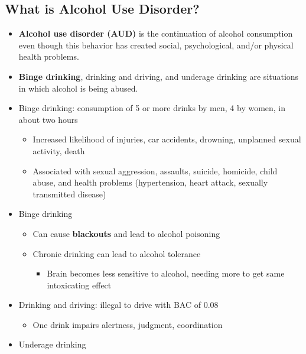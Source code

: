 \documentclass[12pt]{article}
\begin{document}
        \subsection{What is Alcohol Use Disorder?}
            \begin{itemize}
                \item \textbf{Alcohol use disorder (AUD)} is the continuation of alcohol consumption even though this behavior has created social, psychological, and/or physical health problems.
                \item \textbf{Binge drinking}, drinking and driving, and underage drinking are situations in which alcohol is being abused.
                \item Binge drinking: consumption of 5 or more drinks by men, 4 by women, in about two hours
                    \begin{itemize}
                        \item Increased likelihood of injuries, car accidents, drowning, unplanned sexual activity, death
                        \item Associated with sexual aggression, assaults, suicide, homicide, child abuse, and health problems (hypertension, heart attack, sexually transmitted disease)
                    \end{itemize}
                \item Binge drinking
                    \begin{itemize}
                        \item Can cause \textbf{blackouts} and lead to alcohol poisoning
                        \item Chronic drinking can lead to alcohol tolerance
                            \begin{itemize}
                                \item Brain becomes less sensitive to alcohol, needing more to get same intoxicating effect
                            \end{itemize}
                    \end{itemize}
                \item Drinking and driving: illegal to drive with BAC of 0.08
                    \begin{itemize}
                        \item One drink impairs alertness, judgment, coordination
                    \end{itemize}
                \item Underage drinking

\end{itemize}
\end{document}
